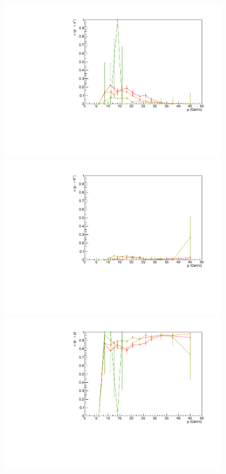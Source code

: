 \begin{figure}[!p]
  \centering
	\includegraphics[scale=0.38]{./gfx/pp_pi.pdf}
  \includegraphics[scale=0.38]{./gfx/pp_K.pdf}
  \includegraphics[scale=0.38]{./gfx/pp_p.pdf}

\end{figure}
